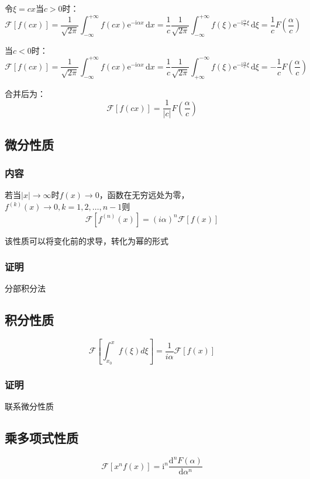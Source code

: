 令\(\xi=cx\)当\(c>0\)时：
\[
\mathscr{F}[f(cx)]=\frac{1}{\sqrt{2\pi}}\int_{-\infty}^{+\infty}{f(cx)\mathrm{e}^{-\mathrm{i}\alpha x}\,\mathrm{d}x}=\frac{1}{c}\frac{1}{\sqrt{2\pi}}\int_{-\infty}^{+\infty}f(\xi)\mathrm{e}^{-\mathrm{i}\frac{\alpha}{c}\xi}\,\mathrm{d}\xi=\frac{1}{c}F(\frac{\alpha}{c})
\]

当\(c<0\)时：
\[
\mathscr{F}[f(cx)]=\frac{1}{\sqrt{2\pi}}\int_{-\infty}^{+\infty}{f(cx)\mathrm{e}^{-\mathrm{i}\alpha x}\,\mathrm{d}x}=\frac{1}{c}\frac{1}{\sqrt{2\pi}}\int_{+\infty}^{-\infty}f(\xi)\mathrm{e}^{-\mathrm{i}\frac{\alpha}{c}\xi}\,\mathrm{d}\xi=-\frac{1}{c}F(\frac{\alpha}{c})
\]

合并后为：
\[
\mathscr{F}[f(cx)]=\frac{1}{|c|}F(\frac{\alpha}{c})
\]

\subsection{微分性质}

\subsubsection{内容}

若当\(|x|\to\infty\)时\(f(x)\to0\)，函数在无穷远处为零，\(f^{(k)}(x)\to0,k=1,2,\ldots,n-1\)则
\[
\mathscr{F}[f^{(n)}(x)]=(i\alpha)^n\mathscr{F}[f(x)]
\]

该性质可以将变化前的求导，转化为幂的形式

\subsubsection{证明}

分部积分法

\subsection{积分性质}
\[
\mathscr{F}\left[\int_{x_0}^{x} f(\xi)d\xi\right]=\frac{1}{i\alpha}\mathscr{F}[f(x)]
\]

\subsubsection{证明}

联系微分性质

\subsection{乘多项式性质}
\[
\mathscr{F}[x^nf(x)]=\mathrm{i}^n\frac{\mathrm{d}^nF(\alpha)}{\mathrm{d}\alpha^n}
\]

